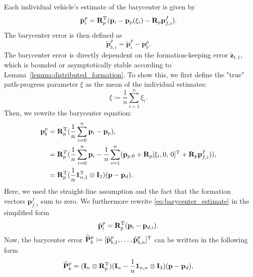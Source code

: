 Each individual vehicle's estimate of the barycenter is given by 
\begin{equation}\label{eq:barycenter_estimate}
    \tilde{\mathbf{p}}_{i}^p= \mathbf{R}_p^{\rm T} (\mathbf{p}_i - \mathbf{p}_p (\xi_i) - \mathbf{R}_p \mathbf{p}_{f,i}^f).
\end{equation}
The barycenter error is then defined as
\begin{equation}
    \widetilde{\mathbf{p}}_{b,i}^p = \tilde{\mathbf{p}}_{i}^p- \mathbf{p}_b^p.
\end{equation}
The barycenter error is directly dependent on the formation-keeping error $\widetilde{\mathbf{z}}_{t,1}$, which is bounded or asymptotically stable according to Lemma~\ref{lemma:distributed_formation}. To show this, we first define the "true" path-progress parameter $\xi$ as the mean of the individual estimates:
\begin{equation}
    \xi \coloneqq \frac{1}{n}\sum_{i=1}^n \xi_i.
\end{equation}
Then, we rewrite the barycenter equation:
\begin{equation}
\begin{split}
    \mathbf{p}_b^p &= \mathbf{R}_p^{\rm T} (\frac{1}{n}\sum_{i=0}^n \mathbf{p}_i - \mathbf{p}_p),\\
    &= \mathbf{R}_p^T(\frac{1}{n}\sum_{i=0}^n \mathbf{p}_i - \frac{1}{n} \sum_{i=1}^n (\mathbf{p}_{p,0} + \mathbf{R}_p 
        [\xi_i ,0,\,0]^{\rm T} + \mathbf{R}_p \mathbf{p}_{f,i}^f)),\\
    &= \mathbf{R}_p^{\rm T} (\frac{1}{n} \mathbf{1}_{n,1}^{\rm T} \otimes \mathbf{I}_3)(\mathbf{p}-\mathbf{p}_d).
\end{split}
\end{equation}
Here, we used the straight-line assumption and the fact that the formation vectors $\mathbf{p}_{f,i}^f$ sum to zero. We furthermore rewrite \eqref{eq:barycenter_estimate} in the simplified form
\begin{equation}
    \tilde{\mathbf{p}}_{i}^p= \mathbf{R}_p^{\rm T} (\mathbf{p}_i - \mathbf{p}_{d,i}).
\end{equation}
Now, the barycenter error $\widetilde{\mathbf{P}}_b^p \coloneqq [\widetilde{\mathbf{p}}_{b,1}^p,\ldots, \widetilde{\mathbf{p}}_{b,n}^p]^{\rm T}$ can be written in the following form
\begin{equation}\label{eq:P_bp_error_1}
    \widetilde{\mathbf{P}}_b^p = (\mathbf{I}_n\otimes \mathbf{R}_p^{\rm T}) (\mathbf{I}_n - \frac{1}{n}\mathbf{1}_{n,n}\otimes \mathbf{I}_3)(\mathbf{p}-\mathbf{p}_d),
\end{equation}
